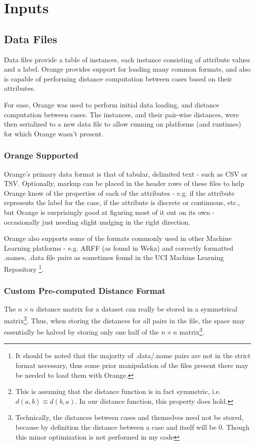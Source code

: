 \documentclass[a4paper,11pt]{report}
\begin{document}
\section{Inputs}
\subsection{Data Files}
Data files provide a table of instances, each instance consisting of attribute values and a label. Orange provides support for loading many common formats, and also is capable of performing distance computation between cases based on their attributes.

For ease, Orange was used to perform initial data loading, and distance computation between cases. The instances, and their pair-wise distances, were then serialized to a new data file to allow running on platforms (and runtimes) for which Orange wasn't present.

\subsubsection{Orange Supported}
Orange's primary data format is that of tabular, delimited text - such as CSV or TSV. Optionally, markup can be placed in the header rows of these files to help Orange know of the properties of each of the attributes - e.g. if the attribute represents the label for the case, if the attribute is discrete or continuous, etc., but Orange is surprisingly good at figuring most of it out on its own - occasionally just needing slight nudging in the right direction.

Orange also supports some of the formats commonly used in other Machine Learning platforms - e.g. ARFF (as found in Weka) and correctly formatted .names, .data file pairs as sometimes found in the UCI Machine Learning Repository \citep{web:uci}\footnote{It should be noted that the majority of .data/.name pairs are not in the strict format necessary, thus some prior manipulation of the files present there may be needed to load them with Orange.}.

\subsubsection{Custom Pre-computed Distance Format}

The $n \times n$ distance matrix for a dataset can really be stored in a symmetrical matrix\footnote{This is assuming that the distance function is in fact symmetric, i.e. $d(a, b)\equiv d(b, a)$. In our distance function, this property does hold.}. Thus, when storing the distances for all pairs in the file, the space may essentially be halved by storing only one half of the $n \times n$ matrix\footnote{Technically, the distances between cases and themselves need not be stored, because by definition the distance between a case and itself will be 0. Though this minor optimization is not performed in my code}.
\end{document}
